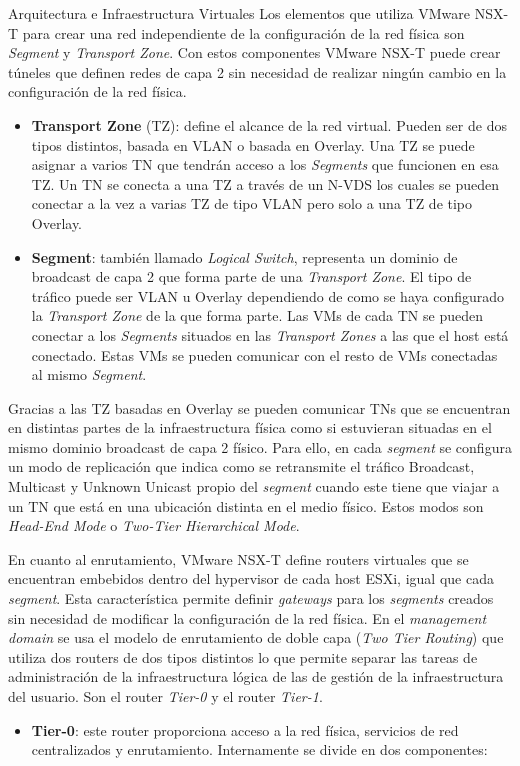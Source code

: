 \begin{subsection}{Arquitectura e Infraestructura Virtuales\cite{CFVirtInfraes}}
Los elementos que utiliza VMware NSX-T para crear una red independiente de la configuración de la red física son \textit{Segment} y \textit{Transport Zone}. Con estos componentes VMware NSX-T puede crear túneles que definen redes de capa 2 sin necesidad de realizar ningún cambio en la configuración de la red física.
\begin{itemize}
  \item \textbf{Transport Zone} (TZ): define el alcance de la red virtual. Pueden ser de dos tipos distintos, basada en VLAN o basada en Overlay. Una TZ se puede asignar a varios TN que tendrán acceso a los \textit{Segments} que funcionen en esa TZ. Un TN se conecta a una TZ a través de un N-VDS los cuales se pueden conectar a la vez a varias TZ de tipo VLAN pero solo a una TZ de tipo Overlay.
  
  \item \textbf{Segment}: también llamado \textit{Logical Switch}, representa un dominio de broadcast de capa 2 que forma parte de una \textit{Transport Zone}. El tipo de tráfico puede ser VLAN u Overlay dependiendo de como se haya configurado la \textit{Transport Zone} de la que forma parte. Las VMs de cada TN se pueden conectar a los \textit{Segments} situados en las \textit{Transport Zones} a las que el host está conectado. Estas VMs se pueden comunicar con el resto de VMs conectadas al mismo \textit{Segment}.
   
\end{itemize}

Gracias a las TZ basadas en Overlay se pueden comunicar TNs que se encuentran en distintas partes de la infraestructura física como si estuvieran situadas en el mismo dominio broadcast de capa 2 físico. Para ello, en cada \textit{segment} se configura un modo de replicación que indica como se retransmite el tráfico Broadcast, Multicast y Unknown Unicast propio del \textit{segment} cuando este tiene que viajar a un TN que está en una ubicación distinta en el medio físico. Estos modos son \textit{Head-End Mode} o \textit{Two-Tier Hierarchical Mode}.

En cuanto al enrutamiento, VMware NSX-T define routers virtuales que se encuentran embebidos dentro del hypervisor de cada host ESXi, igual que cada \textit{segment}. Esta característica permite definir \textit{gateways} para los \textit{segments} creados sin necesidad de modificar la configuración de la red física. En el \textit{management domain} se usa el modelo de enrutamiento de doble capa (\textit{Two Tier Routing}) que utiliza dos routers de dos tipos distintos lo que permite separar las tareas de administración de la infraestructura lógica de las de gestión de la infraestructura del usuario. Son el router \textit{Tier-0} y el router \textit{Tier-1}.
\begin{itemize}
  \item \textbf{Tier-0}: este router proporciona acceso a la red física, servicios de red centralizados y enrutamiento. Internamente se divide en dos componentes:
    \begin{itemize}
      

\end{itemize}
\end{itemize}
\end{subsection}
